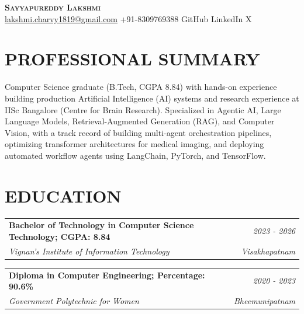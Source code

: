 \documentclass[a4paper,9pt]{extarticle}
\makeatletter
\newcommand{\resumeSubheading}[4]{
  \vspace{0.5pt}
  \begin{tabular*}{1.0\textwidth}[t]{l@{\extracolsep{\fill}}r}
    \textbf{#1} & \textit{\small #2} \\[-1pt]
    \textit{\small #3} & \textit{\small #4}
  \end{tabular*}\vspace{-1.5pt}
}
\makeatother
\begin{document}
\pagestyle{empty}
\thispagestyle{empty}

\begin{center}
  {\LARGE \scshape \textbf{Sayyapureddy Lakshmi}} \\[2pt]
  \small \href{mailto:lakshmi.charvy1819@gmail.com}{\underline{lakshmi.charvy1819@gmail.com}} \enspace\textbar\enspace +91-8309769388 \enspace\textbar\enspace GitHub \enspace\textbar\enspace LinkedIn \enspace\textbar\enspace X
\end{center}
\vspace{-4pt}


\section{PROFESSIONAL SUMMARY}
{\small Computer Science graduate (B.Tech, CGPA 8.84) with hands-on experience building production Artificial Intelligence (AI) systems and research experience at IISc Bangalore (Centre for Brain Research). Specialized in Agentic AI, Large Language Models, Retrieval-Augmented Generation (RAG), and Computer Vision, with a track record of building multi-agent orchestration pipelines, optimizing transformer architectures for medical imaging, and deploying automated workflow agents using LangChain, PyTorch, and TensorFlow.\par}\vspace{2pt}

\section{EDUCATION}
\resumeSubheading
  {Bachelor of Technology in Computer Science Technology; CGPA: 8.84}{2023 - 2026}
  {Vignan's Institute of Information Technology}{Visakhapatnam}
\resumeSubheading
  {Diploma in Computer Engineering; Percentage: 90.6\%}{2020 - 2023}
  {Government Polytechnic for Women}{Bheemunipatnam}
\end{document}
